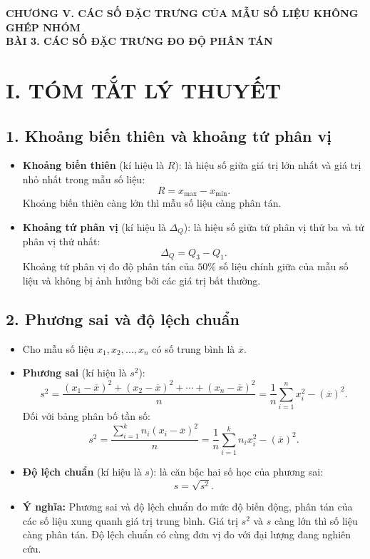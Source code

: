 
\begin{center}
	{\Large\bfseries\color{blue!80!black} CHƯƠNG V. CÁC SỐ ĐẶC TRƯNG CỦA MẪU SỐ LIỆU KHÔNG GHÉP NHÓM}\\[6pt]
	{\large\bfseries\color{red!80!black} BÀI 3. CÁC SỐ ĐẶC TRƯNG ĐO ĐỘ PHÂN TÁN}
\end{center}
\vspace{0.2cm}

\section*{I. TÓM TẮT LÝ THUYẾT}

\subsection*{1. Khoảng biến thiên và khoảng tứ phân vị}
\begin{itemize}
	\item \textbf{Khoảng biến thiên} (kí hiệu là $R$): là hiệu số giữa giá trị lớn nhất và giá trị nhỏ nhất trong mẫu số liệu:
	\[R = x_{\max} - x_{\min}.\]
	Khoảng biến thiên càng lớn thì mẫu số liệu càng phân tán.
	\item \textbf{Khoảng tứ phân vị} (kí hiệu là $\Delta_Q$): là hiệu số giữa tứ phân vị thứ ba và tứ phân vị thứ nhất:
	\[\Delta_Q = Q_3 - Q_1.\]
	Khoảng tứ phân vị đo độ phân tán của $50\%$ số liệu chính giữa của mẫu số liệu và không bị ảnh hưởng bởi các giá trị bất thường.
\end{itemize}

\subsection*{2. Phương sai và độ lệch chuẩn}
\begin{itemize}
	\item Cho mẫu số liệu $x_1, x_2, \ldots, x_n$ có số trung bình là $\overline{x}$.
	\item \textbf{Phương sai} (kí hiệu là $s^2$):
	\[s^2 = \frac{(x_1 - \overline{x})^2 + (x_2 - \overline{x})^2 + \cdots + (x_n - \overline{x})^2}{n} = \frac{1}{n}\sum_{i=1}^n x_i^2 - (\overline{x})^2.\]
	Đối với bảng phân bố tần số:
	\[s^2 = \frac{\sum_{i=1}^k n_i (x_i - \overline{x})^2}{n} = \frac{1}{n}\sum_{i=1}^k n_i x_i^2 - (\overline{x})^2.\]
	\item \textbf{Độ lệch chuẩn} (kí hiệu là $s$): là căn bậc hai số học của phương sai:
	\[s = \sqrt{s^2}.\]
	\item \textbf{Ý nghĩa:} Phương sai và độ lệch chuẩn đo mức độ biến động, phân tán của các số liệu xung quanh giá trị trung bình. Giá trị $s^2$ và $s$ càng lớn thì số liệu càng phân tán. Độ lệch chuẩn có cùng đơn vị đo với đại lượng đang nghiên cứu.
\end{itemize}

